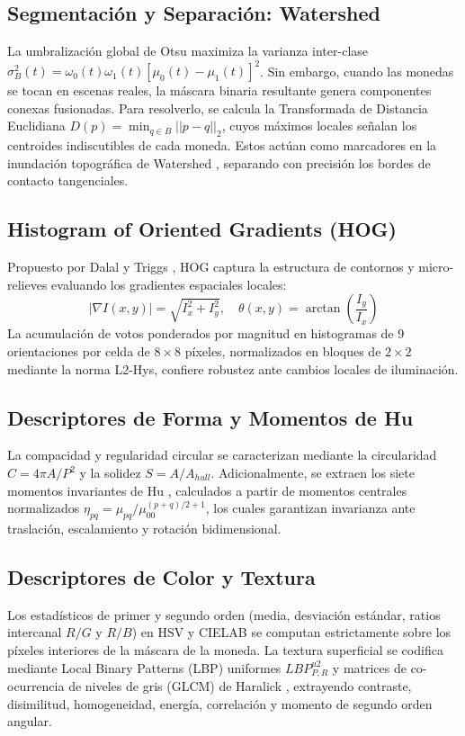 \documentclass[journal,compsoc,twoside]{IEEEtran}
\begin{document}
\subsection{Segmentación y Separación: Watershed}
La umbralización global de Otsu maximiza la varianza inter-clase $\sigma_B^2(t) = \omega_0(t)\omega_1(t)[\mu_0(t) - \mu_1(t)]^2$. Sin embargo, cuando las monedas se tocan en escenas reales, la máscara binaria resultante genera componentes conexas fusionadas. Para resolverlo, se calcula la Transformada de Distancia Euclidiana $D(p) = \min_{q \in B} ||p - q||_2$, cuyos máximos locales señalan los centroides indiscutibles de cada moneda. Estos actúan como marcadores en la inundación topográfica de Watershed \cite{vincent1991watersheds}, separando con precisión los bordes de contacto tangenciales.

\subsection{Histogram of Oriented Gradients (HOG)}
Propuesto por Dalal y Triggs \cite{dalal2005histograms}, HOG captura la estructura de contornos y micro-relieves evaluando los gradientes espaciales locales:
\begin{equation}
|\nabla I(x, y)| = \sqrt{I_x^2 + I_y^2}, \quad \theta(x, y) = \arctan\left(\frac{I_y}{I_x}\right)
\end{equation}
La acumulación de votos ponderados por magnitud en histogramas de 9 orientaciones por celda de $8 \times 8$ píxeles, normalizados en bloques de $2 \times 2$ mediante la norma L2-Hys, confiere robustez ante cambios locales de iluminación.

\subsection{Descriptores de Forma y Momentos de Hu}
La compacidad y regularidad circular se caracterizan mediante la circularidad $C = 4\pi A / P^2$ y la solidez $S = A / A_{hull}$. Adicionalmente, se extraen los siete momentos invariantes de Hu \cite{hu1962visual}, calculados a partir de momentos centrales normalizados $\eta_{pq} = \mu_{pq} / \mu_{00}^{(p+q)/2 + 1}$, los cuales garantizan invarianza ante traslación, escalamiento y rotación bidimensional.

\subsection{Descriptores de Color y Textura}
Los estadísticos de primer y segundo orden (media, desviación estándar, ratios intercanal $R/G$ y $R/B$) en HSV y CIELAB se computan estrictamente sobre los píxeles interiores de la máscara de la moneda. La textura superficial se codifica mediante Local Binary Patterns (LBP) uniformes $LBP_{P, R}^{u2}$ \cite{ojala2002multiresolution} y matrices de co-ocurrencia de niveles de gris (GLCM) de Haralick \cite{haralick1973textural}, extrayendo contraste, disimilitud, homogeneidad, energía, correlación y momento de segundo orden angular.
\end{document}
